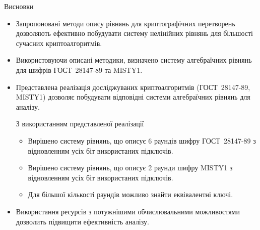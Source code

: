 \documentclass[10pt, ucs]{beamer}
\begin{document}
\begin{frame}{Висновки}
    \begin{itemize}
        \item Запропоновані методи опису рівнянь для криптографічних
            перетворень дозволяють ефективно побудувати систему нелінійних
            рівнянь для більшості сучасних криптоалгоритмів.
        \item Використовуючи описані методики, визначено систему алгебраїчних
            рівнянь для шифрів ГОСТ~28147-89 та MISTY1.
        \item Представлена реалізація досліджуваних криптоалгоритмів
            (ГОСТ~28147-89, MISTY1) дозволяє побудувати відповідні системи
            алгебраїчних рівнянь для аналізу.
            \begin{block}{З використанням представленої реалізації}
                \begin{itemize}
                    \item Вирішено систему рівнянь, що описує 6 раундів шифру ГОСТ~28147-89
                        з відновленням усіх біт використаних підключів.
                    \item Вирішено систему рівнянь, що описує 2 раунди шифру MISTY1
                        з відновленням усіх біт використаних підключів.
                    \item Для більшої кількості раундів можливо знайти еквівалентні ключі.
                \end{itemize}
            \end{block}
        \item Використання ресурсів з потужнішими обчислювальними можливостями
            дозволить підвищити ефективність аналізу.
    \end{itemize}
\end{frame}
\end{document}
